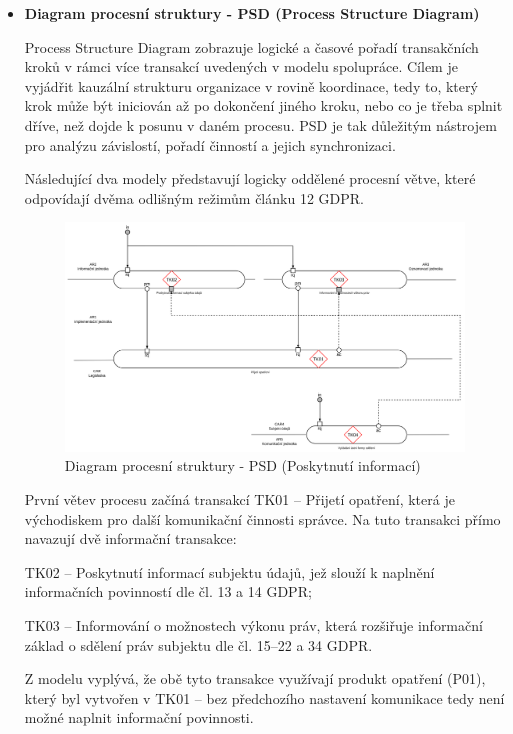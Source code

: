 \begin{itemize}
  \item \textbf{Diagram procesní struktury - PSD (Process Structure Diagram)}

  Process Structure Diagram zobrazuje logické a časové pořadí transakčních kroků v rámci více transakcí uvedených v modelu spolupráce. Cílem je vyjádřit kauzální strukturu organizace v rovině koordinace, tedy to, který krok může být iniciován až po dokončení jiného kroku, nebo co je třeba splnit dříve, než dojde k posunu v daném procesu. PSD je tak důležitým nástrojem pro analýzu závislostí, pořadí činností a jejich synchronizaci.

  Následující dva modely představují logicky oddělené procesní větve, které odpovídají dvěma odlišným režimům článku 12 GDPR.

  \begin{figure}[H]
    \centering
    \includegraphics[width=\textwidth]{images/demo_psd_informace.png}
    \caption{Diagram procesní struktury - PSD (Poskytnutí informací)}
    \label{fig:demo_psd_informace}
  \end{figure}

  První větev procesu začíná transakcí TK01 – Přijetí opatření, která je východiskem pro další komunikační činnosti správce. Na tuto transakci přímo navazují dvě informační transakce:

  TK02 – Poskytnutí informací subjektu údajů, jež slouží k naplnění informačních povinností dle čl. 13 a 14 GDPR;
  
  TK03 – Informování o možnostech výkonu práv, která rozšiřuje informační základ o sdělení práv subjektu dle čl. 15–22 a 34 GDPR.
  
  Z modelu vyplývá, že obě tyto transakce využívají produkt opatření (P01), který byl vytvořen v TK01 – bez předchozího nastavení komunikace tedy není možné naplnit informační povinnosti.
  

\end{itemize}

